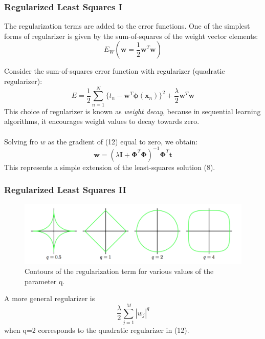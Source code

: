 \documentclass{beamer}
\begin{document}

\begin{frame}
\frametitle{Regularized Least Squares I}
The regularization terms are added to the error functions. One of the simplest forms of regularizer is given by the sum-of-squares of the weight vector elements:
\begin{equation}
E_W(\bm{w} = \frac{1}{2}\bm{w}^T\bm{w})
\end{equation}

Consider the sum-of-squares error function with regularizer (quadratic regularizer):
\begin{equation}
 E = \frac{1}{2}\sum_{n=1}^{N}\{t_n-\bm{w}^T\bm{\phi}(\bm{x}_n)\}^2+\frac{\lambda}{2}\bm{w}^T\bm{w}
\end{equation}
 This choice of regularizer is known as \textit{weight decay}, because in sequential learning algorithms, it encourages weight values to decay towards zero.\\~\\
 
 Solving fro $w$ as the gradient of (12) equal to zero, we obtain:
 \begin{equation}
 \bm{w} = (\lambda \bm{I} + \bm{\Phi}^T \bm{\Phi})^{-1} \bm{\Phi}^T\bm{t}
 \end{equation}
 This represents a simple extension of the least-squares solution (8).
 
\end{frame}



\begin{frame}
\frametitle{Regularized Least Squares II}

\begin{figure}
\includegraphics[width=12cm]{Figure3}
\caption{Contours of the regularization term for various values of the parameter q.}
\label{Figure3}
\end{figure}

A more general regularizer is 
\begin{equation}
\frac{\lambda}{2} \sum_{j=1}^M|w_j|^q
\end{equation}
when q=2 corresponds to the quadratic regularizer in (12).\\~\\
\end{frame}
\end{document}
